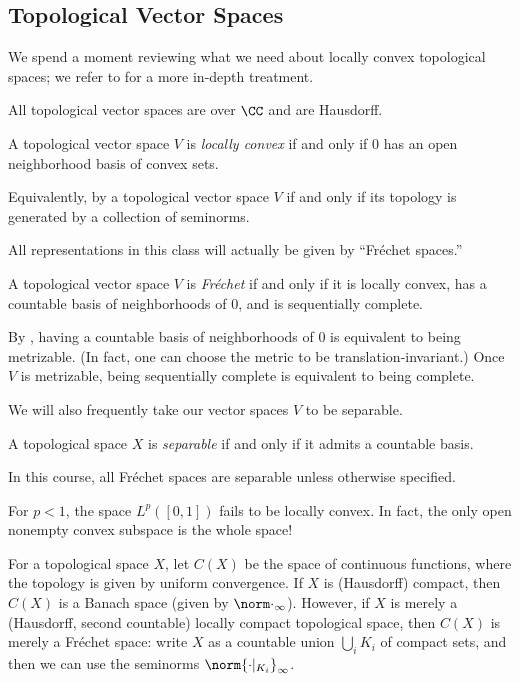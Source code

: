\documentclass[../notes.tex]{subfiles}
\begin{document}
\subsection{Topological Vector Spaces}
We spend a moment reviewing what we need about locally convex topological spaces; we refer to  for a more in-depth treatment.
\begin{conv}
	All topological vector spaces are over $\CC$ and are Hausdorff.
\end{conv}
\begin{definition}
	A topological vector space $V$ is \textit{locally convex} if and only if $0$ has an open neighborhood basis of convex sets.
\end{definition}
\begin{remark}
	Equivalently, by  a topological vector space $V$ if and only if its topology is generated by a collection of seminorms.
\end{remark}
All representations in this class will actually be given by ``Fr\'echet spaces.''
\begin{definition}[Fr\'echet]
	A topological vector space $V$ is \textit{Fr\'echet} if and only if it is locally convex, has a countable basis of neighborhoods of $0$, and is sequentially complete.
\end{definition}
\begin{remark}
	By , having a countable basis of neighborhoods of $0$ is equivalent to being metrizable. (In fact, one can choose the metric to be translation-invariant.) Once $V$ is metrizable, being sequentially complete is equivalent to being complete.
\end{remark}
We will also frequently take our vector spaces $V$ to be separable.
\begin{definition}[separable]
	A topological space $X$ is \textit{separable} if and only if it admits a countable basis.
\end{definition}
\begin{conv}
	In this course, all Fr\'echet spaces are separable unless otherwise specified.
\end{conv}
\begin{nex}
	For $p<1$, the space $L^p([0,1])$ fails to be locally convex. In fact, the only open nonempty convex subspace is the whole space!
\end{nex}
\begin{example}
	For a topological space $X$, let $C(X)$ be the space of continuous functions, where the topology is given by uniform convergence. If $X$ is (Hausdorff) compact, then $C(X)$ is a Banach space (given by $\norm\cdot_\infty$). However, if $X$ is merely a (Hausdorff, second countable) locally compact topological space, then $C(X)$ is merely a Fr\'echet space: write $X$ as a countable union $\bigcup_i K_i$ of compact sets, and then we can use the seminorms $\norm{\cdot|_{K_i}}_{\infty}$.
\end{example}
\end{document}
